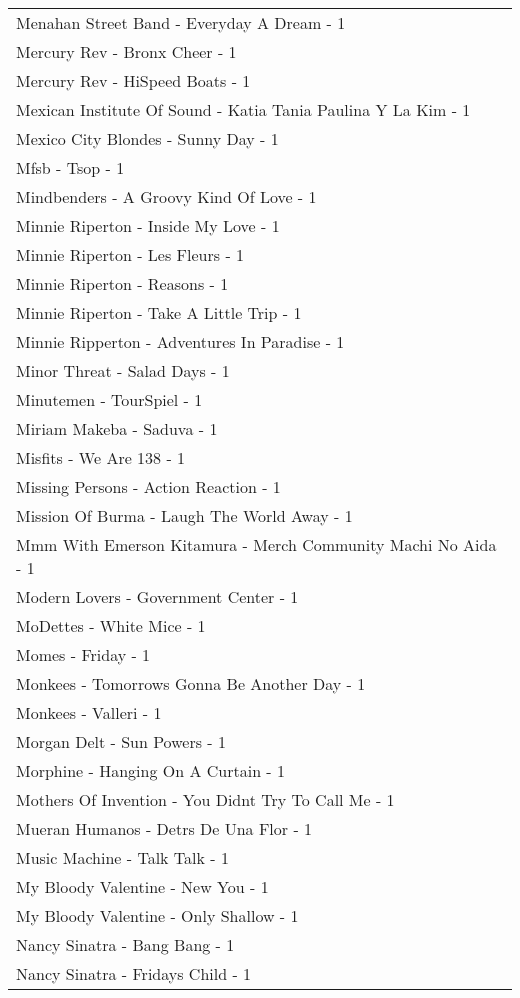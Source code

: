 \documentclass[
]{article}
\begin{document}
\begin{longtable}{l}
Menahan Street Band - Everyday A Dream - 1 \\ 
Mercury Rev - Bronx Cheer - 1 \\ 
Mercury Rev - HiSpeed Boats - 1 \\ 
Mexican Institute Of Sound - Katia Tania Paulina Y La Kim - 1 \\ 
Mexico City Blondes - Sunny Day - 1 \\ 
Mfsb - Tsop - 1 \\ 
Mindbenders - A Groovy Kind Of Love - 1 \\ 
Minnie Riperton - Inside My Love - 1 \\ 
Minnie Riperton - Les Fleurs - 1 \\ 
Minnie Riperton - Reasons - 1 \\ 
Minnie Riperton - Take A Little Trip - 1 \\ 
Minnie Ripperton - Adventures In Paradise - 1 \\ 
Minor Threat - Salad Days - 1 \\ 
Minutemen - TourSpiel - 1 \\ 
Miriam Makeba - Saduva - 1 \\ 
Misfits - We Are 138 - 1 \\ 
Missing Persons - Action Reaction - 1 \\ 
Mission Of Burma - Laugh The World Away - 1 \\ 
Mmm With Emerson Kitamura - Merch Community Machi No Aida - 1 \\ 
Modern Lovers - Government Center - 1 \\ 
MoDettes - White Mice - 1 \\ 
Momes - Friday - 1 \\ 
Monkees - Tomorrows Gonna Be Another Day - 1 \\ 
Monkees - Valleri - 1 \\ 
Morgan Delt - Sun Powers - 1 \\ 
Morphine - Hanging On A Curtain - 1 \\ 
Mothers Of Invention - You Didnt Try To Call Me - 1 \\ 
Mueran Humanos - Detrs De Una Flor - 1 \\ 
Music Machine - Talk Talk - 1 \\ 
My Bloody Valentine - New You - 1 \\ 
My Bloody Valentine - Only Shallow - 1 \\ 
Nancy Sinatra - Bang Bang - 1 \\ 
Nancy Sinatra - Fridays Child - 1 \\ 

\end{longtable}
\end{document}
